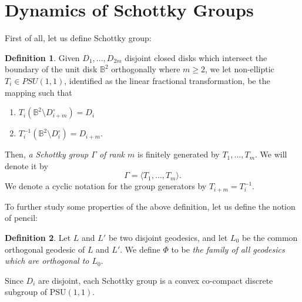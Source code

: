 \documentclass[12pt,oneside]{sfsuthesis}
\theoremstyle{plain} %
\theoremstyle{definition}  %
\newtheorem{definition}{Definition}[chapter]
\theoremstyle{remark}  %
\theoremstyle{plain}
\begin{document}
{%

\section{Dynamics of Schottky Groups}\label{Dynamics of Schottky Groups}


First of all, let us define Schottky group:
\begin{definition}\label{def schottky}
Given $D_1,...,D_{2m}$ disjoint closed disks which intersect the boundary of the unit disk $\mathbb{B}^2$ orthogonally where $m\geq 2$, we let non-elliptic $T_i\in PSU (1,1)$, identified as the linear fractional transformation, be the  mapping such that 
\begin{enumerate}
\item $T_i (\mathbb{B}^2\setminus D^{\circ}_{i+m}) = D_{i}$
\item $T_i^{-1}\left( \mathbb{B}^2\setminus D^{\circ}_{i}\right)=D_{i+m}$.
\end{enumerate}
Then, \textit{a Schottky group $\Gamma$ of rank $m$} is finitely generated by $T_1,...,T_m$. We will denote it by  
$$
\Gamma = \langle T_1,...,T_m\rangle. 
$$
We denote a cyclic notation for the group generators by $T_{i+m} = T_i^{-1}$.  
\end{definition}

To further study some properties of the above definition, let us define the notion of pencil:
\begin{definition}\label{family of isometric circles}
Let $L$ and $L'$ be two disjoint geodesics, and let $L_0$ be the common orthogonal geodesic of $L$ and $L'$. We define $\Phi$ to be \textit{the family of all geodesics which are orthogonal to $L_0$}. %
\end{definition}




Since $D_i$ are disjoint, each Schottky group is a convex co-compact discrete subgroup of $\text{PSU}(1,1)$.

}
\end{document}

